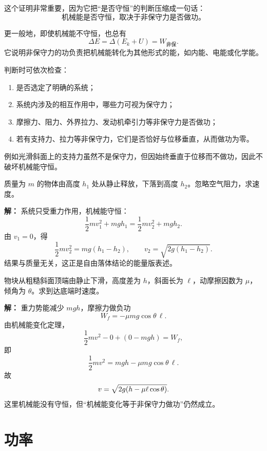 这个证明非常重要，因为它把“是否守恒”的判断压缩成一句话：
\[
\boxed{\ \text{机械能是否守恒，取决于非保守力是否做功。}\ }
\]

\begin{theorem}[机械能变化定理]
更一般地，即使机械能不守恒，也总有
\[
\Delta E = \Delta(E_k+U)=W_{\text{非保}}.
\]
它说明非保守力的功负责把机械能转化为其他形式的能，如内能、电能或化学能。
\end{theorem}

\begin{remark}[判断机械能守恒的条件]
判断时可依次检查：
\begin{enumerate}
  \item 是否选定了明确的系统；
  \item 系统内涉及的相互作用中，哪些力可视为保守力；
  \item 摩擦力、阻力、外界拉力、发动机牵引力等非保守力是否做功；
  \item 若有支持力、拉力等非保守力，它们是否恰好与位移垂直，从而做功为零。
\end{enumerate}
例如光滑斜面上的支持力虽然不是保守力，但因始终垂直于位移而不做功，因此不破坏机械能守恒。
\end{remark}

\begin{example}[自由下落的机械能守恒]
质量为 $m$ 的物体由高度 $h_1$ 处从静止释放，下落到高度 $h_2$。忽略空气阻力，求速度。

\textbf{解：}
系统只受重力作用，机械能守恒：
\[
\frac{1}{2}mv_1^2+mgh_1=\frac{1}{2}mv_2^2+mgh_2.
\]
由 $v_1=0$，得
\[
\frac{1}{2}mv_2^2=mg(h_1-h_2),
\qquad
v_2=\sqrt{2g(h_1-h_2)}.
\]
结果与质量无关，这正是自由落体结论的能量版表述。
\end{example}

\begin{example}[含摩擦时机械能不守恒]
物块从粗糙斜面顶端由静止下滑，高度差为 $h$，斜面长为 $\ell$，动摩擦因数为 $\mu$，倾角为 $\theta$。求到达底端时速度。

\textbf{解：}
重力势能减少 $mgh$，摩擦力做负功
\[
W_f=-\mu mg\cos\theta\,\ell.
\]
由机械能变化定理，
\[
\frac{1}{2}mv^2 - 0 + (0-mgh)=W_f,
\]
即
\[
\frac{1}{2}mv^2 = mgh-\mu mg\cos\theta\,\ell.
\]
故
\[
v=\sqrt{2g\qty(h-\mu \ell\cos\theta)}.
\]
这里机械能没有守恒，但“机械能变化等于非保守力做功”仍然成立。
\end{example}

\section{功率}\label{sec:power}

